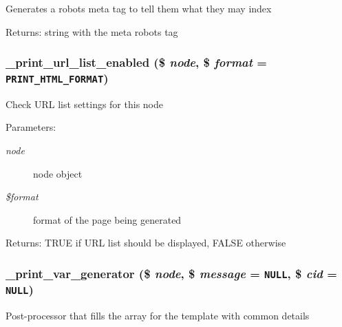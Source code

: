 Generates a robots meta tag to tell them what they may index

\begin{Desc}
\item[Returns:]string with the meta robots tag \end{Desc}
\hypertarget{print_8pages_8inc_bb60369f083f953df28e49d688f2856f}{
\subsubsection[{\_\-print\_\-url\_\-list\_\-enabled}]{\setlength{\rightskip}{0pt plus 5cm}\_\-print\_\-url\_\-list\_\-enabled (\$ {\em node}, \/  \$ {\em format} = {\tt PRINT\_\-HTML\_\-FORMAT})}}
\label{print_8pages_8inc_bb60369f083f953df28e49d688f2856f}


Check URL list settings for this node

\begin{Desc}
\item[Parameters:]
\begin{description}
\item[{\em node}]node object \item[{\em \$format}]format of the page being generated \end{description}
\end{Desc}
\begin{Desc}
\item[Returns:]TRUE if URL list should be displayed, FALSE otherwise \end{Desc}
\hypertarget{print_8pages_8inc_3f1f36e3e7024c0e0a1bbca71250c571}{
\subsubsection[{\_\-print\_\-var\_\-generator}]{\setlength{\rightskip}{0pt plus 5cm}\_\-print\_\-var\_\-generator (\$ {\em node}, \/  \$ {\em message} = {\tt NULL}, \/  \$ {\em cid} = {\tt NULL})}}
\label{print_8pages_8inc_3f1f36e3e7024c0e0a1bbca71250c571}


Post-processor that fills the array for the template with common details

